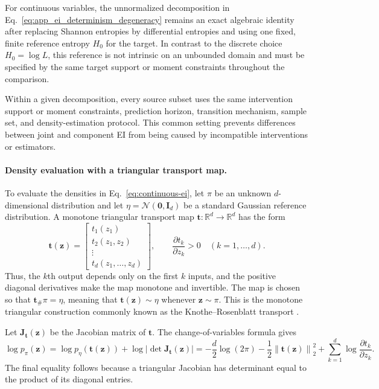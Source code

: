 \documentclass[fleqn,10pt]{wlscirep}
\begin{document}
For continuous variables, the unnormalized decomposition in
Eq.~\eqref{eq:app_ei_determinism_degeneracy} remains an exact algebraic
identity after replacing Shannon entropies by differential entropies and
using one fixed, finite reference entropy \(H_0\) for the target.  In
contrast to the discrete choice \(H_0=\log L\), this reference is not
intrinsic on an unbounded domain and must be specified by the same target
support or moment constraints throughout the comparison.

Within a given decomposition, every source subset uses the same intervention
support or moment constraints, prediction horizon, transition mechanism,
sample set, and density-estimation protocol.  This common setting prevents
differences between joint and component EI from being caused by incompatible
interventions or estimators.

\paragraph{Density evaluation with a triangular transport map.}
To evaluate the densities in Eq.~\eqref{eq:continuous-ei}, let
\(\pi\) be an unknown \(d\)-dimensional distribution and let
\(\eta=\mathcal{N}(\boldsymbol{0},\mathbf{I}_d)\) be a standard Gaussian
reference distribution.  A monotone triangular transport map
\(\boldsymbol{t}:\mathbb{R}^{d}\to\mathbb{R}^{d}\) has the form
\begin{equation}
\boldsymbol{t}(\boldsymbol{z})
=
\begin{bmatrix}
t_1(z_1)\\
t_2(z_1,z_2)\\
\vdots\\
t_d(z_1,\ldots,z_d)
\end{bmatrix},
\qquad
\frac{\partial t_k}{\partial z_k}>0
\quad (k=1,\ldots,d).
\label{eq:transport-map-triangular}
\end{equation}
Thus, the \(k\)th output depends only on the first \(k\) inputs, and the
positive diagonal derivatives make the map monotone and invertible.  The map
is chosen so that
\(\boldsymbol{t}_{\#}\pi=\eta\), meaning that
\(\boldsymbol{t}(\boldsymbol{z})\sim\eta\) whenever
\(\boldsymbol{z}\sim\pi\).  This is the monotone triangular construction
commonly known as the Knothe--Rosenblatt transport
\cite{baptista2024representation}.

Let \(\mathbf{J}_{\boldsymbol{t}}(\boldsymbol{z})\) be the Jacobian matrix of
\(\boldsymbol{t}\).  The change-of-variables formula gives
\begin{equation}
\log p_{\pi}(\boldsymbol{z})
=
\log p_{\eta}\!\left(\boldsymbol{t}(\boldsymbol{z})\right)
+
\log
\left|
\det \mathbf{J}_{\boldsymbol{t}}(\boldsymbol{z})
\right|
=
-\frac{d}{2}\log(2\pi)
-\frac{1}{2}
\left\|
\boldsymbol{t}(\boldsymbol{z})
\right\|_2^2
+
\sum_{k=1}^{d}
\log
\frac{\partial t_k}{\partial z_k}.
\label{eq:transport-map-change-of-variables}
\end{equation}
The final equality follows because a triangular Jacobian has determinant
equal to the product of its diagonal entries.
\end{document}
